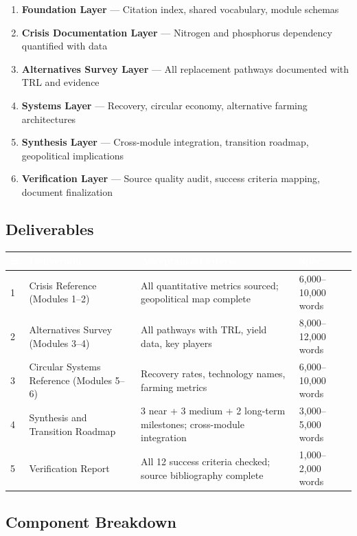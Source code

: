 \documentclass[11pt,letterpaper]{article}
\newcommand{\tableheader}[1]{\textbf{\sffamily\textcolor{white}{#1}}}
\begin{document}
\begin{enumerate}[leftmargin=1.5em]
  \item \textbf{Foundation Layer} --- Citation index, shared vocabulary, module schemas
  \item \textbf{Crisis Documentation Layer} --- Nitrogen and phosphorus dependency quantified with data
  \item \textbf{Alternatives Survey Layer} --- All replacement pathways documented with TRL and evidence
  \item \textbf{Systems Layer} --- Recovery, circular economy, alternative farming architectures
  \item \textbf{Synthesis Layer} --- Cross-module integration, transition roadmap, geopolitical implications
  \item \textbf{Verification Layer} --- Source quality audit, success criteria mapping, document finalization
\end{enumerate}

\subsection{Deliverables}

\begin{center}
\begin{tabularx}{\textwidth}{C{0.5cm}L{3.5cm}L{4cm}L{4cm}}
\toprule
{}
\tableheader{\#} & \tableheader{Deliverable} & \tableheader{Acceptance Criteria} & \tableheader{Spec} \\
 & Crisis Reference (Modules 1--2) & All quantitative metrics sourced; geopolitical map complete & 6,000--10,000 words \\
2 & Alternatives Survey (Modules 3--4) & All pathways with TRL, yield data, key players & 8,000--12,000 words \\
3 & Circular Systems Reference (Modules 5--6) & Recovery rates, technology names, farming metrics & 6,000--10,000 words \\
4 & Synthesis and Transition Roadmap & 3 near + 3 medium + 2 long-term milestones; cross-module integration & 3,000--5,000 words \\
5 & Verification Report & All 12 success criteria checked; source bibliography complete & 1,000--2,000 words \\
\bottomrule
\end{tabularx}
\end{center}

\subsection{Component Breakdown}
\end{document}
